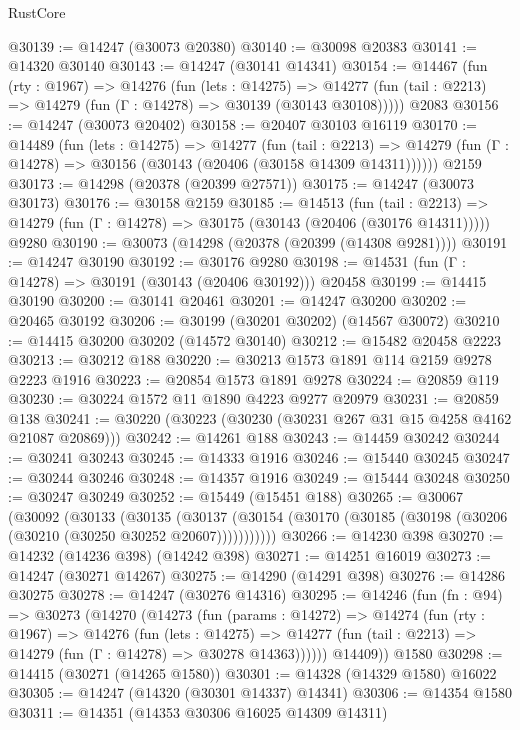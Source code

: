 \begin{lexlean}{RustCore}
\begin{coremodule}
@30139 := @14247 (@30073 @20380)
@30140 := @30098 @20383
@30141 := @14320 @30140
@30143 := @14247 (@30141 @14341)
@30154 := @14467
    (fun (rty : @1967) =>
    @14276
      (fun (lets : @14275) =>
      @14277 (fun (tail : @2213) => @14279 (fun (Γ : @14278) => @30139 (@30143 @30108)))))
    @2083
@30156 := @14247 (@30073 @20402)
@30158 := @20407 @30103 @16119
@30170 := @14489
    (fun (lets : @14275) =>
    @14277
      (fun (tail : @2213) =>
      @14279 (fun (Γ : @14278) => @30156 (@30143 (@20406 (@30158 @14309 @14311))))))
    @2159
@30173 := @14298 (@20378 (@20399 @27571))
@30175 := @14247 (@30073 @30173)
@30176 := @30158 @2159
@30185 := @14513
    (fun (tail : @2213) => @14279 (fun (Γ : @14278) => @30175 (@30143 (@20406 (@30176 @14311)))))
    @9280
@30190 := @30073 (@14298 (@20378 (@20399 (@14308 @9281))))
@30191 := @14247 @30190
@30192 := @30176 @9280
@30198 := @14531 (fun (Γ : @14278) => @30191 (@30143 (@20406 @30192))) @20458
@30199 := @14415 @30190
@30200 := @30141 @20461
@30201 := @14247 @30200
@30202 := @20465 @30192
@30206 := @30199 (@30201 @30202) (@14567 @30072)
@30210 := @14415 @30200 @30202 (@14572 @30140)
@30212 := @15482 @20458 @2223
@30213 := @30212 @188
@30220 := @30213 @1573 @1891 @114 @2159 @9278 @2223 @1916
@30223 := @20854 @1573 @1891 @9278
@30224 := @20859 @119
@30230 := @30224 @1572 @11 @1890 @4223 @9277 @20979
@30231 := @20859 @138
@30241 := @30220 (@30223 (@30230 (@30231 @267 @31 @15 @4258 @4162 @21087 @20869)))
@30242 := @14261 @188
@30243 := @14459 @30242
@30244 := @30241 @30243
@30245 := @14333 @1916
@30246 := @15440 @30245
@30247 := @30244 @30246
@30248 := @14357 @1916
@30249 := @15444 @30248
@30250 := @30247 @30249
@30252 := @15449 (@15451 @188)
@30265 := @30067
    (@30092
      (@30133
        (@30135
          (@30137 (@30154 (@30170 (@30185 (@30198 (@30206 (@30210 (@30250 @30252 @20607)))))))))))
@30266 := @14230 @398
@30270 := @14232 (@14236 @398) (@14242 @398)
@30271 := @14251 @16019
@30273 := @14247 (@30271 @14267)
@30275 := @14290 (@14291 @398)
@30276 := @14286 @30275
@30278 := @14247 (@30276 @14316)
@30295 := @14246
    (fun (fn : @94) =>
    @30273
      (@14270
        (@14273
          (fun (params : @14272) =>
          @14274
            (fun (rty : @1967) =>
            @14276
              (fun (lets : @14275) =>
              @14277 (fun (tail : @2213) => @14279 (fun (Γ : @14278) => @30278 @14363))))))
        @14409))
    @1580
@30298 := @14415 (@30271 (@14265 @1580))
@30301 := @14328 (@14329 @1580) @16022
@30305 := @14247 (@14320 (@30301 @14337) @14341)
@30306 := @14354 @1580
@30311 := @14351 (@14353 @30306 @16025 @14309 @14311)

\end{coremodule}
\end{lexlean}
